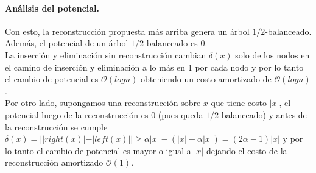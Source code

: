 \documentclass[dcc,uchile]{fcfmcourse}
\theoremstyle{plain}
\theoremstyle{definition}
\begin{document}
 \paragraph{Análisis del potencial.}
 Con esto, la reconstrucción propuesta más arriba genera un árbol $1/2$-balanceado. Además, el potencial de un árbol $1/2$-balanceado es 0.\\
 
 La inserción y eliminación sin reconstrucción cambian $\delta(x)$ solo de los nodos en el camino de inserción y eliminación a lo más en 1 por cada nodo y por lo tanto el cambio de potencial es $\mathcal{O}(log n)$ obteniendo un costo amortizado de $\mathcal{O}(log n)$.\\
 
 Por otro lado, supongamos una reconstrucción sobre $x$ que tiene costo  $|x|$, el potencial luego de la reconstrucción es 0 (pues queda $1/2$-balanceado) y antes de la reconstrucción se cumple $\delta(x) = ||right(x)|-|left(x)|| \ge \alpha|x| - (|x| - \alpha |x|) = (2\alpha - 1) |x|$ y por lo tanto el cambio de potencial es mayor o igual a $|x|$ dejando el costo de la reconstrucción amortizado  $\mathcal{O}(1)$.
 
\end{document}
